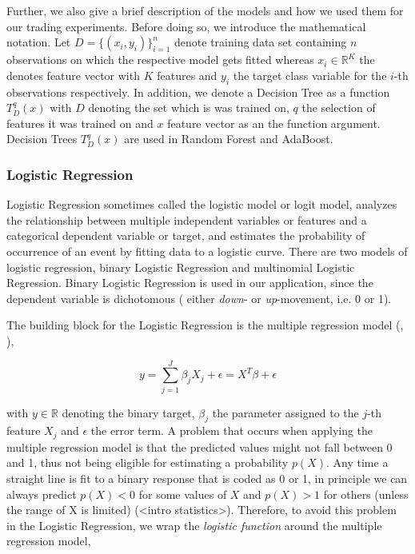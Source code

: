 Further, we also give a brief description of the models and how we used them for our trading experiments.
Before doing so, we introduce the mathematical notation. 
Let $ D = \{ (x_{i}, y_{i}) \}_{i=1}^{n} $ denote training data set containing $ n $ observations on which the respective model gets fitted
whereas $ x_{i} \in \mathbb{R}^{K} $ the denotes feature vector with $K$ features and $ y_{i} $ the target class variable for the $ i $-th observations respectively.
In addition, we denote a Decision Tree \cite{breiman1984decisionTree} as a function $ T_{D}^{q}(x) $ with $ D $ denoting the set which is was trained on,
$ q $ the selection of features it was trained on and $ x $ feature vector as an the function argument.
Decision Trees $ T_{D}^{q}(x) $ are used in Random Forest and AdaBoost.



\subsubsection{Logistic Regression} \label{ch:logistic_regression}
Logistic Regression sometimes called the logistic model or logit model,
analyzes the relationship between multiple independent variables or features and a
categorical dependent variable or target, and estimates the probability of occurrence
of an event by fitting data to a logistic curve. There are two models
of logistic regression, binary Logistic Regression and multinomial Logistic
Regression. Binary Logistic Regression is used in our application, since the dependent
variable is dichotomous ( either \emph{down}- or \emph{up}-movement, i.e. 0 or 1).

The building block for the Logistic Regression is the multiple regression model (\cite{james2013statisticalLearning}, \cite{park2013logisticRegression}),


\begin{equation}
    y = \sum_{j=1}^{J} \beta_{j} X_{j} + \epsilon =  X^{T}\beta + \epsilon
\end{equation}

with $y \in \mathbb{R}$ denoting the binary target, $\beta_{j}$ the parameter assigned to the $j$-th feature $X_{j}$ 
and $\epsilon$ the error term.
A problem that occurs when applying the multiple regression model is that the predicted values might
not fall between 0 and 1, thus not being eligible for estimating a probability $p(X)$.
Any time a straight line is fit to a binary response that is coded as
0 or 1, in principle we can always predict $p(X) < 0$ for some values of $X$
and $p(X) > 1$ for others (unless the range of X is limited) (<intro statistics>).
Therefore, to avoid this problem in the Logistic Regression, 
we wrap the \emph{logistic function} around the multiple regression model,

